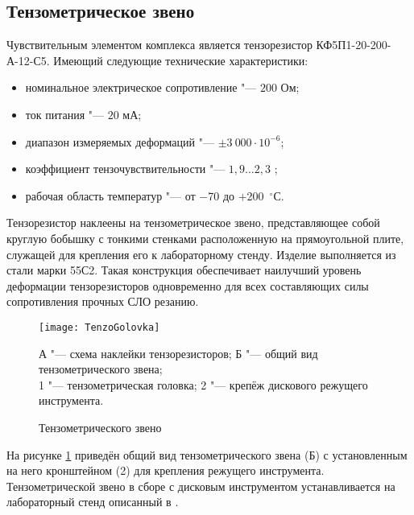 \subsection{Тензометрическое звено}\label{subsect2_4_1}

Чувствительным элементом комплекса является тензорезистор КФ5П1-20-200-А-12-С5. Имеющий следующие технические характеристики: 
\begin{itemize}
	\item номинальное электрическое сопротивление "--- $200$ Ом;
	\item ток питания "--- $20$ мА;
	\item диапазон измеряемых деформаций "--- $\pm3~000\cdot10^{-6}$;
	\item коэффициент тензочувствительности "--- $1,9\ldots2,3$ ;
	\item рабочая область температур "--- от $-$70 до $+$200~${}^\circ$С.
\end{itemize}

Тензорезистор наклеены на тензометрическое звено, представляющее собой круглую бобышку с тонкими стенками расположенную на прямоугольной плите, служащей для крепления его к лабораторному стенду. Изделие выполняется из стали марки 55С2. Такая конструкция обеспечивает наилучший уровень деформации тензорезисторов одновременно для всех составляющих силы сопротивления прочных СЛО резанию.

\begin{figure} [htbp]
	\center
	\texttt{[image: TenzoGolovka]}
	
	А "--- схема наклейки тензорезисторов; Б "--- общий вид тензометрического звена;\\
	1 "--- тензометрическая головка; 2 "--- крепёж дискового режущего инструмента.
	\caption{Тензометрического звено} 
	\label{img:TenzoGolovka}  
\end{figure}

На рисунке \ref{img:TenzoGolovka} приведён общий вид тензометрического звена (Б) с установленным на него кронштейном (2) для крепления режущего инструмента. Тензометрической звено в сборе с дисковым инструментом устанавливается на лабораторный стенд описанный в \todo{[ссылки]}.

